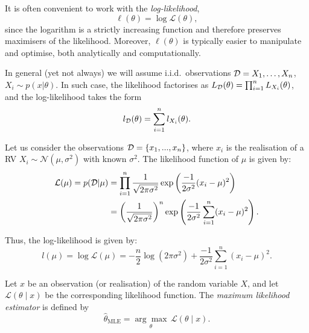 \begin{remark}
It is often convenient to work with the \emph{log-likelihood},
\[
    \ell(\theta) = \log \mathcal{L}(\theta),
\]
since the logarithm is a strictly increasing function and therefore preserves maximisers of the likelihood. Moreover, $\ell(\theta)$ is typically easier to manipulate and optimise, both analytically and computationally.
\end{remark}

\begin{remark}
In general (yet not always) we will assume i.i.d.~observations ${\mathcal D} = {X_1,\ldots,X_n}$, $X_i\sim p(x|\theta)$. In such case, the likelihood factorises as $L_{\mathcal D}(\theta) = \prod_{i=1}^n L_{X_i}(\theta)$, and the log-likelihood takes the form
\begin{equation}
l_{\mathcal D}(\theta) = \sum_{i=1}^nl_{X_i}(\theta).
\end{equation}
\end{remark}


\begin{example}
\label{ex:ell_mean_Gaussian}
Let us consider the observations ${\mathcal D} = \{x_1,...,x_n\}$, where $x_i$ is the realisation of a RV $X_i\sim \mathcal{N}(\mu,\sigma^2)$ with known $\sigma^2$. The likelihood function of $\mu$ is given by:
\begin{align}
\mathcal{L}(\mu)=p({\mathcal D}|\mu)&=\prod_{i=1}^{n} \frac{1}{\sqrt{2 \pi \sigma^{2}}} 
\exp\left(\frac{-1}{2\sigma^{2}}(x_i-\mu)^{2}\right)\nonumber\\
&= \left(\frac{1}{\sqrt{2 \pi \sigma^{2}}}\right)^{n} \exp\left(\frac{-1}{2 \sigma^{2}} \sum_{i=1}^{n} (x_i - \mu )^{2}\right).
\end{align}

Thus, the log-likelihood is given by:
\begin{equation}
    l(\mu)= \log \mathcal{L}(\mu) = -\frac{n}{2} \log(2 \pi \sigma^{2}) + \frac{-1}{2\sigma^{2}} \sum_{i=1}^{n} (x_i - \mu )^{2}.
\end{equation}

\end{example}

\begin{definition}
    Let $x$ be an observation (or realisation) of the random variable $X$, and let 
    $\mathcal{L}(\theta \mid x)$ be the corresponding likelihood function. The 
    \emph{maximum likelihood estimator} is defined by
    \begin{equation}
        \hat{\theta}_{\mathrm{MLE}} = \underset{\theta}{\arg\max}\, \mathcal{L}(\theta \mid x).
    \end{equation}
\end{definition}

